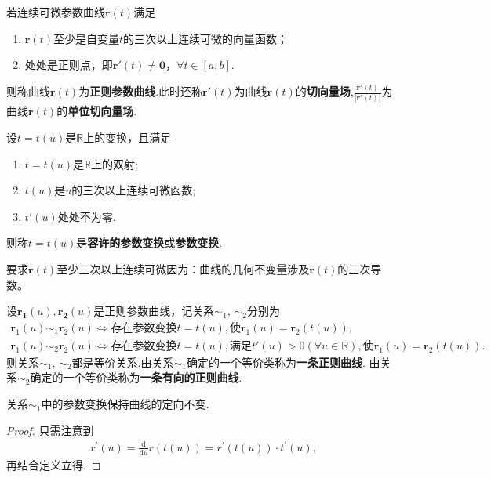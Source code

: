 \documentclass[../../main.tex]{subfiles}%
\begin{document}
\begin{definition}[正则参数曲线和参数变换]
若连续可微参数曲线$\bm{r}(t)$满足
\begin{enumerate}[(1)]
\item $\bm{r}(t)$至少是自变量$t$的三次以上连续可微的向量函数；

\item 处处是正则点，即$\bm{r}'(t)\neq \bm{0}$，$\forall t\in[a,b]$.
\end{enumerate}
则称曲线$\bm{r}(t)$为\textbf{正则参数曲线}.此时还称$\bm{r}'(t)$为曲线$\bm{r}(t)$的\textbf{切向量场},$\frac{\bm{r}'(t)}{|\bm{r}'(t)|}$为曲线$\bm{r}(t)$的\textbf{单位切向量场}.

设$t=t(u)$是$\mathbb{R}$上的变换，且满足
\begin{enumerate}[(1)]
\item $t=t(u)$是$\mathbb{R}$上的双射;

\item $t(u)$是$u$的三次以上连续可微函数;

\item $t'(u)$处处不为零.
\end{enumerate}
则称$t=t(u)$是\textbf{容许的参数变换}或\textbf{参数变换}.
\end{definition}
\begin{remark}
要求$\bm{r}(t)$至少三次以上连续可微因为：曲线的几何不变量涉及$\bm{r}(t)$的三次导数。
\end{remark}

\begin{theorem}
设$\bm{r_1}(u),\bm{r_2}(u)$是正则参数曲线，记关系$\sim_1,\,\sim_2$分别为
\begin{gather*}
\boldsymbol{r}_1(u)\sim_1 \boldsymbol{r}_2(u)\Longleftrightarrow \text{存在参数变换}t=t\left( u \right) ,\text{使}\boldsymbol{r}_1\left( u \right) =\boldsymbol{r}_2\left( t\left( u \right) \right),
\\
\boldsymbol{r}_1(u)\sim_2 \boldsymbol{r}_2(u)\Longleftrightarrow \text{存在参数变换}t=t\left( u \right) ,\text{满足}t\prime \left( u \right) >0\left( \forall u\in \mathbb{R} \right) ,\text{使}\boldsymbol{r}_1\left( u \right) =\boldsymbol{r}_2\left( t\left( u \right) \right) .
\end{gather*}
则关系$\sim_1,\,\sim_2$都是等价关系.由关系$\sim_1$确定的一个等价类称为\textbf{一条正则曲线}.
由关系$\sim_2$确定的一个等价类称为\textbf{一条有向的正则曲线}.
\end{theorem}
\begin{note}
关系$\sim_1$中的参数变换保持曲线的定向不变.
\end{note}
\begin{proof}
只需注意到
\begin{align*}
r^{\prime}\left( u \right) =\frac{\mathrm{d}}{\mathrm{d}u}r\left( t\left( u \right) \right) =r^{\prime}\left( t\left( u \right) \right) \cdot t^{\prime}\left( u \right) ,
\end{align*}
再结合定义立得.
\end{proof}
\end{document}
